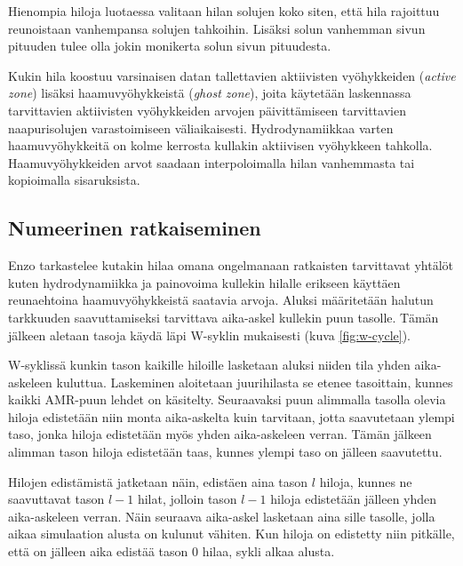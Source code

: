 \documentclass[12pt,a4paper]{article}
\begin{document}
Hienompia hiloja luotaessa valitaan hilan solujen koko siten, että hila rajoittuu reunoistaan vanhempansa solujen tahkoihin. Lisäksi solun vanhemman sivun pituuden tulee olla jokin monikerta solun sivun pituudesta. \cite{enzo}

Kukin hila koostuu varsinaisen datan tallettavien aktiivisten vyöhykkeiden (\textit{active zone}) lisäksi haamuvyöhykkeistä (\textit{ghost zone}), joita käytetään laskennassa tarvittavien aktiivisten vyöhykkeiden arvojen päivittämiseen tarvittavien naapurisolujen varastoimiseen väliaikaisesti. Hydrodynamiikkaa varten haamuvyöhykkeitä on kolme kerrosta kullakin aktiivisen vyöhykkeen tahkolla. Haamuvyöhykkeiden arvot saadaan interpoloimalla hilan vanhemmasta tai kopioimalla sisaruksista.\cite{arxivenzo, enzo}

\subsection{Numeerinen ratkaiseminen}
Enzo tarkastelee kutakin hilaa omana ongelmanaan ratkaisten tarvittavat yhtälöt kuten hydrodynamiikka ja painovoima kullekin hilalle erikseen käyttäen reunaehtoina haamuvyöhykkeistä saatavia arvoja. Aluksi määritetään halutun tarkkuuden saavuttamiseksi tarvittava aika-askel kullekin puun tasolle. Tämän jälkeen aletaan tasoja käydä läpi W-syklin mukaisesti (kuva \ref{fig:w-cycle}). \cite{enzo} %

W-syklissä kunkin tason kaikille hiloille lasketaan aluksi niiden tila yhden aika-askeleen kuluttua. Laskeminen aloitetaan juurihilasta se etenee tasoittain, kunnes kaikki AMR-puun lehdet on käsitelty. Seuraavaksi puun alimmalla tasolla olevia hiloja edistetään niin monta aika-askelta kuin tarvitaan, jotta saavutetaan ylempi taso, jonka hiloja edistetään myös yhden aika-askeleen verran. Tämän jälkeen alimman tason hiloja edistetään taas, kunnes ylempi taso on jälleen saavutettu. \cite{enzo}

Hilojen edistämistä jatketaan näin, edistäen aina tason $l$ hiloja, kunnes ne saavuttavat tason $l-1$ hilat, jolloin tason $l-1$ hiloja edistetään jälleen yhden aika-askeleen verran. Näin seuraava aika-askel lasketaan aina sille tasolle, jolla aikaa simulaation alusta on kulunut vähiten. Kun hiloja on edistetty niin pitkälle, että on jälleen aika edistää tason 0 hilaa, sykli alkaa alusta. \cite{enzo}
\end{document}
